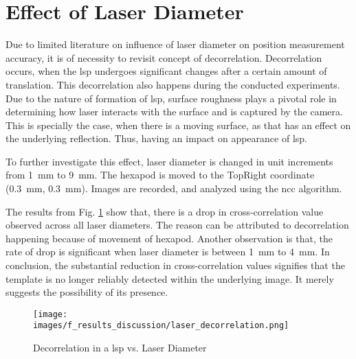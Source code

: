

\section{Effect of Laser Diameter}
Due to limited literature on influence of laser diameter on position measurement accuracy, it is of necessity to revisit concept of decorrelation. Decorrelation occurs, when the \gls{lsp} undergoes significant changes after a certain amount of translation. This decorrelation also happens during the conducted experiments. Due to the nature of formation of \gls{lsp}, surface roughness plays a pivotal role in determining how laser interacts with the surface and is captured by the camera. This is specially the case, when there is a moving surface, as that has an effect on the underlying reflection. Thus, having an impact on appearance of \gls{lsp}. 

\vspace{5mm}
\noindent To further investigate this effect, laser diameter is changed in unit increments from \SI{1}{\milli\meter} to \SI{9}{\milli\meter}. The hexapod is moved to the \textsf{TopRight} coordinate (\SI{0.3}{\milli\meter}, \SI{0.3}{\milli\meter}). Images are recorded, and analyzed using the \gls{ncc} algorithm. 

\vspace{5mm}
\noindent The results from Fig. \ref{fig:laser_decorrelation.png} show that, there is a drop in cross-correlation value observed across all laser diameters. The reason can be attributed to decorrelation happening because of movement of hexapod. Another observation is that, the rate of drop is significant when laser diameter is between \SI{1}{\milli\meter} to \SI{4}{\milli\meter}. In conclusion, the substantial reduction in cross-correlation values signifies that the template is no longer reliably detected within the underlying image. It merely suggests the possibility of its presence.

\begin{figure}[h]
    \centering
    \texttt{[image: images/f\_results\_discussion/laser\_decorrelation.png]}
    \caption{Decorrelation in a \gls{lsp} vs. Laser Diameter}
    \label{fig:laser_decorrelation.png}
\end{figure}

\clearpage